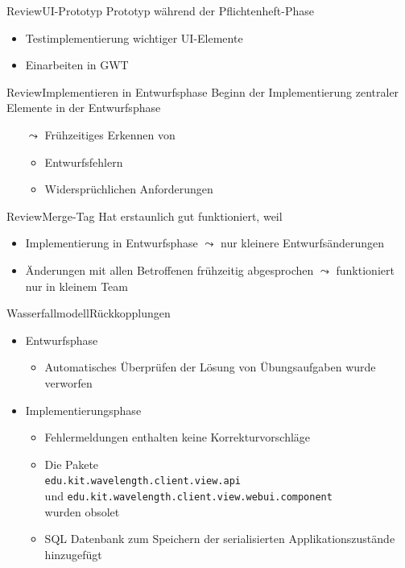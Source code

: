 \documentclass[10pt]{beamer}
\begin{document}
\begin{frame}{Review}{UI-Prototyp}
Prototyp während der Pflichtenheft-Phase
	\begin{itemize}
		\item Testimplementierung wichtiger UI-Elemente
		\item Einarbeiten in GWT
	\end{itemize}
\end{frame}

\begin{frame}{Review}{Implementieren in Entwurfsphase}
Beginn der Implementierung zentraler Elemente in der Entwurfsphase 
	\begin{itemize}
		\item[$\leadsto$] Frühzeitiges Erkennen von 
		\begin{itemize}
			\item Entwurfsfehlern
			\item Widersprüchlichen Anforderungen
		\end{itemize}
	\end{itemize}
\end{frame}

\begin{frame}{Review}{Merge-Tag}
Hat erstaunlich gut funktioniert, weil
	\begin{itemize}
		\item Implementierung in Entwurfsphase $\leadsto$ nur kleinere Entwurfsänderungen %
		\item Änderungen mit allen Betroffenen frühzeitig abgesprochen $\leadsto$ funktioniert nur in kleinem Team
	\end{itemize}
\end{frame}

\begin{frame}{Wasserfallmodell}{Rückkopplungen}
\begin{itemize}
	\item Entwurfsphase
	\begin{itemize}
			\item Automatisches Überprüfen der Lösung von Übungsaufgaben wurde verworfen
	\end{itemize}
	\item Implementierungsphase
	\begin{itemize}
		\item Fehlermeldungen enthalten keine Korrekturvorschläge
		\item Die Pakete \\ \texttt{edu.kit.wavelength.client.view.api} \\ und \texttt{edu.kit.wavelength.client.view.webui.component} \\
		 wurden obsolet
		\item SQL Datenbank zum Speichern der serialisierten Applikationszustände hinzugefügt
	\end{itemize}
\end{itemize}
\end{frame}
\end{document}
